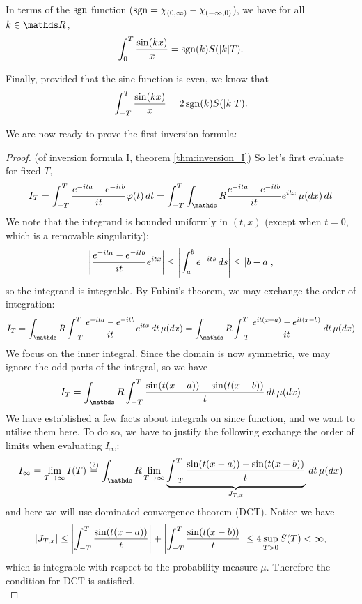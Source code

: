 In terms of the $\operatorname*{sgn}$ function ($\operatorname*{sgn} = \chi_{(0,\infty)} - \chi_{(-\infty,0)}$), we have for all $k \in \R$,
\begin{equation}
\int_0^T \frac{\sin(kx)}{x} = \operatorname*{sgn}(k) S(|k|T).
\end{equation}

Finally, provided that the sinc function is even, we know that
\begin{equation}
\int_{-T}^T \frac{\sin(kx)}{x} = 2\operatorname*{sgn}(k) S(|k|T).
\end{equation}

We are now ready to prove the first inversion formula:

\begin{proof} (of inversion formula I, theorem \ref{thm:inversion_I})
So let's first evaluate for fixed $T$,
\begin{equation}
I_T = \int_{-T}^T \frac{e^{-ita}-e^{-itb}}{it} \varphi(t) \, dt = \int_{-T}^T \int_\R \frac{e^{-ita}-e^{-itb}}{it} e^{itx} \, \mu(dx) \, dt
\end{equation}
We note that the integrand is bounded uniformly in $(t,x)$ (except when $t = 0$, which is a removable singularity):
\begin{equation}
\left| \frac{e^{-ita} - e^{-itb}}{it} e^{itx} \right| \leq \left| \int_a^b e^{-its} \, ds \right| \leq |b-a|, \label{eq:exponent_integral_estimate}
\end{equation}
so the integrand is integrable. By Fubini's theorem, we may exchange the order of integration:
\begin{equation}
I_T = \int_\R \int_{-T}^T \frac{e^{-ita}-e^{-itb}}{it} e^{itx} \, dt \, \mu(dx) = \int_\R \int_{-T}^T \frac{e^{it(x-a)}-e^{it(x-b)}}{it} \, dt \, \mu(dx) 
\end{equation}
We focus on the inner integral. Since the domain is now symmetric, we may ignore the odd parts of the integral, so we have
\begin{equation}
I_T = \int_\R \int_{-T}^T \frac{\sin(t(x-a)) - \sin(t(x-b))}{t} \, dt \, \mu(dx) 
\end{equation}
We have established a few facts about integrals on since function, and we want to utilise them here. To do so, we have to justify the following exchange the order of limits when evaluating $I_\infty$:
\begin{equation*}
I_\infty = \lim_{T\to\infty} I(T) \overset{(?)}{=} \int_\R \lim_{T\to\infty} \underbrace{\int_{-T}^T \frac{\sin(t(x-a)) - \sin(t(x-b))}{t}}_{J_{T,x}} \, dt \, \mu(dx) 
\end{equation*}
and here we will use dominated convergence theorem (DCT). Notice we have
\begin{equation*}
    \left| J_{T,x} \right| \leq \left| \int_{-T}^T \frac{\sin(t(x-a))}{t} \right| + \left| \int_{-T}^T \frac{\sin(t(x-b))}{t} \right| \leq 4 \sup_{T>0} S(T) < \infty,
\end{equation*}
which is integrable with respect to the probability measure $\mu$. Therefore the condition for DCT is satisfied. \\


\end{proof}
